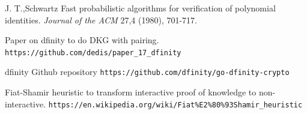 \documentclass{article}
\begin{document}
\begin{thebibliography}{9}
J. T.,Schwartz Fast probabilistic algorithms for verification of polynomial identities. \textit{Journal of the ACM} 27,4 (1980), 701-717.


Paper on dfinity to do DKG with pairing.
\texttt{https://github.com/dedis/paper\_17\_dfinity}

dfinity Github repository
\texttt{https://github.com/dfinity/go-dfinity-crypto}

Fiat-Shamir heuristic to transform interactive proof of knowledge to non-interactive.
\texttt{https://en.wikipedia.org/wiki/Fiat\%E2\%80\%93Shamir\_heuristic}
\end{thebibliography}
\end{document}
